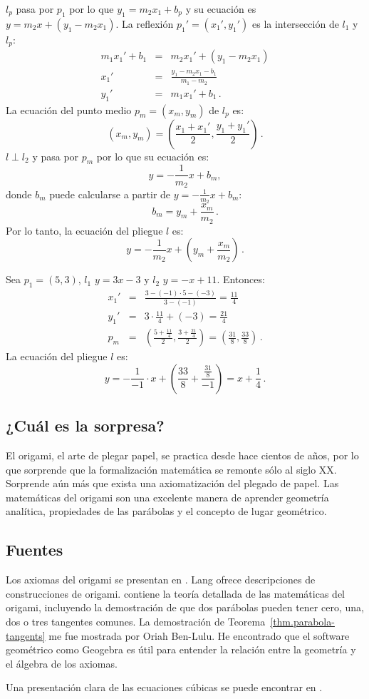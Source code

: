 $l_p$ pasa por $p_1$ por lo que $y_1=m_2x_1+b_p$ y su ecuación es $y=m_2x+(y_1-m_2x_1)$. La reflexión $p_1'=(x_1',y_1')$ es la intersección de $l_1$ y $l_p$:
\begin{eqnarray*}
m_1x_1'+b_1&=&m_2x_1'+(y_1-m_2x_1)\\
x_1'&=&\frac{y_1-m_2x_1-b_1}{m_1-m_2}\\
y_1'&=&m_1x_1'+b_1\,.
\end{eqnarray*}
La ecuación del punto medio $p_m=(x_m,y_m)$ de $l_p$ es:
\[
(x_m,y_m)=\left(\frac{x_1+x_1'}{2},\frac{y_1+y_1'}{2}\right)\,.
\]
$l\perp l_2$ y pasa por $p_m$ por lo que su ecuación es:
\[
y=-\frac{1}{m_2}x+b_m,
\]
donde $b_m$ puede calcularse a partir de $y=-\displaystyle\frac{1}{m_2}x+b_m$:
\[b_m=y_m+\frac{x_m}{m_2}\,.\]
Por lo tanto, la ecuación del pliegue $l$ es:
\[
y=-\frac{1}{m_2}x+\left(y_m+\displaystyle\frac{x_m}{m_2}\right)\,.
\]
\begin{example}
Sea $p_1=(5,3)$, $l_1$ $y=3x-3$ y $l_2$ $y=-x+11$. Entonces:
\begin{eqnarray*}
x_1'&=&\frac{3-(-1)\cdot 5-(-3)}{3-(-1)}=\frac{11}{4}\\
y_1'&=&3\cdot \frac{11}{4} + (-3)=\frac{21}{4}\\
p_m&=&\left(\frac{5+\displaystyle\frac{11}{4}}{2},\frac{3+\displaystyle\frac{21}{4}}{2}\right)=\left(\frac{31}{8},\frac{33}{8}\right)\,.
\end{eqnarray*}
La ecuación del pliegue $l$ es:
\[
y=-\frac{1}{-1}\cdot x+\left(\frac{33}{8}+\frac{\displaystyle\frac{31}{8}}{-1}\right)=x+\frac{1}{4}\,.
\]
\end{example}

\subsection*{¿Cuál es la sorpresa?}

El origami, el arte de plegar papel, se practica desde hace cientos de años, por lo que sorprende que la formalización matemática se remonte sólo al siglo XX. Sorprende aún más que exista una axiomatización del plegado de papel. Las matemáticas del origami son una excelente manera de aprender geometría analítica, propiedades de las parábolas y el concepto de lugar geométrico.



\subsection*{Fuentes}

Los axiomas del origami se presentan en \cite{wiki:hh-axioms}. Lang \cite{lang} ofrece descripciones de construcciones de origami. 
\cite[Capítulo~10]{martin} contiene la teoría detallada de las matemáticas del origami, incluyendo la demostración de que dos parábolas pueden tener cero, una, dos o tres tangentes comunes. La demostración de Teorema~\ref{thm.parabola-tangents} me fue mostrada por Oriah Ben-Lulu. He encontrado que el software geométrico como Geogebra es útil para entender la relación entre la geometría y el álgebra de los axiomas.

Una presentación clara de las ecuaciones cúbicas se puede encontrar en \cite[Capítulos~1,\ 2]{jorg}.
